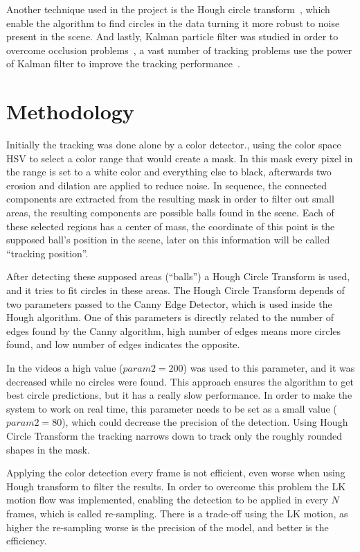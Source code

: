 \documentclass[10pt,twocolumn,letterpaper]{article}
\begin{document}
  Another technique used in the project is the Hough circle transform~\cite{illingworth1987adaptive}, which enable  the algorithm to find circles in the data turning it more robust to noise present in the scene. And lastly, Kalman particle filter was studied in order to overcome occlusion problems~\cite{ristic2004beyond}, a vast number of tracking problems use the power of Kalman filter to improve the tracking performance~\cite{satoh2004color}.

  
\section{Methodology}

Initially the tracking was done alone by a color detector., using the color space HSV to select a color range that would create a mask. In this mask every pixel in the range is set to a white color and everything else to black, afterwards two erosion and dilation are applied to reduce noise. In sequence, the connected components are extracted from the resulting mask in order to filter out small areas, the resulting components are possible balls found in the scene. Each of these selected regions has a center of mass, the coordinate of this point is the supposed ball's position in the scene, later on this information will be called ``tracking position''.

After detecting these supposed areas (``balls'') a Hough Circle Transform  is used, and it tries to fit circles in these areas. The Hough Circle Transform depends of two parameters passed to the Canny Edge Detector, which is used inside the Hough algorithm.  One of this parameters is directly related to the number of edges found by the Canny algorithm, high number of edges means more circles found, and low number of edges indicates the opposite. 

In the videos a high value ($param2 = 200$) was used to this parameter, and it was decreased while no circles were found. This approach ensures the algorithm to get best circle predictions, but it has a really slow performance. In order to make the system to work on real time, this parameter needs to be set as a small value ($param2 = 80$), which could decrease the precision of the detection. Using Hough Circle Transform the tracking narrows down to track only the roughly rounded shapes in the mask.

Applying the color detection every frame is not efficient, even worse when using Hough transform to filter the results. In order to overcome this problem the LK motion flow was implemented, enabling the detection to be applied  in every $N$ frames, which is called re-sampling. There is a trade-off using the LK motion, as higher the re-sampling worse is the precision of the model, and better is the efficiency.
  
\end{document}
